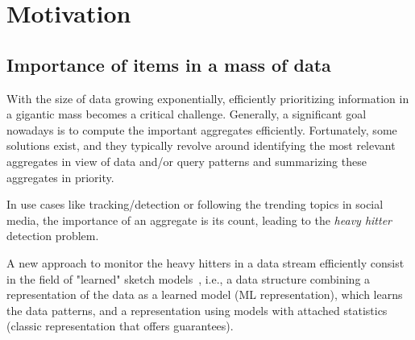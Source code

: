 
\section{Motivation}

\subsection{Importance of items in a mass of data}
With the size of data growing exponentially, efficiently prioritizing information in a gigantic mass becomes a critical challenge. Generally, a significant goal nowadays is to compute the important aggregates efficiently. Fortunately, some solutions exist, and they typically revolve around identifying the most relevant aggregates in view of data and/or query patterns and summarizing these aggregates in priority.

% 
% 
% 

In use cases like tracking/detection or following the trending topics in social media, the importance of an aggregate is its count, leading to the \emph{heavy hitter} detection problem.

A new approach to monitor the heavy hitters in a data stream efficiently consist in the field of "learned" sketch models~\cite{hsu2019learning,kristo2020case,9458912}, i.e., a data structure combining a representation of the data as a learned model (ML representation), which learns the data patterns, and a representation using models with attached statistics (classic representation that offers guarantees).

% 


